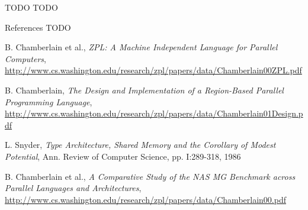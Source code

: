 \begin{frame}{TODO}
  TODO
\end{frame}

\note{
}

\begin{frame}{References}
  TODO

  \begin{thebibliography}{10}
    \beamertemplatearticlebibitems

    B. Chamberlain et al., {\em ZPL: A Machine Independent Language
      for Parallel Computers},
    \url{http://www.cs.washington.edu/research/zpl/papers/data/Chamberlain00ZPL.pdf}
    
    B. Chamberlain, {\em The Design and Implementation of a
      Region-Based Parallel Programming Language},
    \url{http://www.cs.washington.edu/research/zpl/papers/data/Chamberlain01Design.pdf}

    L. Snyder, {\em Type Architecture, Shared Memory and the Corollary
      of Modest Potential}, Ann. Review of Computer Science,
    pp. I:289-318, 1986

    B. Chamberlain et al., {\em A Comparative Study of the NAS MG
      Benchmark across Parallel Languages and Architectures},
    \url{http://www.cs.washington.edu/research/zpl/papers/data/Chamberlain00.pdf}
  \end{thebibliography}
\end{frame}




